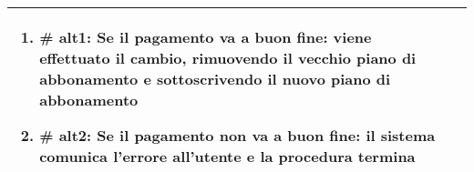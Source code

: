 \begin{center}
\begin{table}[bp]
\begin{tabular}{ |p{2.6cm}|p{13cm}|  }
\begin{enumerate}
\begin{enumerate}[  ]
					\begin{enumerate}[label*=\arabic*.]
						\item \textbf{\# alt1}: Se il pagamento va a buon fine: viene effettuato il cambio, rimuovendo il vecchio piano di abbonamento e sottoscrivendo il nuovo piano di abbonamento
						\item \textbf{\# alt2}: Se il pagamento non va a buon fine: il sistema comunica l'errore all'utente e la procedura termina
					\end{enumerate}
			\end{enumerate}
			\end{enumerate}\\\hline
\end{tabular}
\label{table_use_case:\lastUC}\newline
\end{table}


\end{center}
